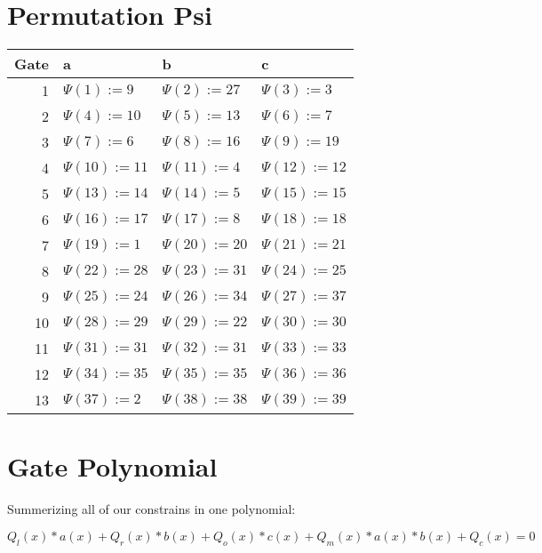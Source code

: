 \documentclass[11pt]{article}
\begin{document}
\section{Permutation Psi}
\label{sec:org8d7dfb9}
\begin{center}
\begin{tabular}{rlll}
Gate & a & b & c\\[0pt]
\hline
1 & \(\Psi(1) := 9\) & \(\Psi(2):={27}\) & \(\Psi(3) := 3\)\\[0pt]
2 & \(\Psi(4) := {10}\) & \(\Psi(5):={13}\) & \(\Psi(6) := 7\)\\[0pt]
3 & \(\Psi(7) := 6\) & \(\Psi(8) := {16}\) & \(\Psi(9) := {19}\)\\[0pt]
4 & \(\Psi({10}) := {11}\) & \(\Psi({11}) := 4\) & \(\Psi({12}) := {12}\)\\[0pt]
5 & \(\Psi({13}) := {14}\) & \(\Psi({14}) := {5}\) & \(\Psi({15}) := {15}\)\\[0pt]
6 & \(\Psi({16}) := {17}\) & \(\Psi({17}) := {8}\) & \(\Psi({18}) := {18}\)\\[0pt]
7 & \(\Psi({19}) := {1}\) & \(\Psi({20}) := {20}\) & \(\Psi({21}) := {21}\)\\[0pt]
8 & \(\Psi({22}) := {28}\) & \(\Psi({23}) := {31}\) & \(\Psi({24}) := {25}\)\\[0pt]
9 & \(\Psi({25}) := {24}\) & \(\Psi({26}) := {34}\) & \(\Psi({27}) := {37}\)\\[0pt]
10 & \(\Psi({28}) := {29}\) & \(\Psi({29}) := {22}\) & \(\Psi({30}) := {30}\)\\[0pt]
11 & \(\Psi({31}) := {31}\) & \(\Psi({32}) := {31}\) & \(\Psi({33}) := {33}\)\\[0pt]
12 & \(\Psi({34}) := {35}\) & \(\Psi({35}) := {35}\) & \(\Psi({36}) := {36}\)\\[0pt]
13 & \(\Psi({37}) := {2}\) & \(\Psi({38}) := {38}\) & \(\Psi({39}) := {39}\)\\[0pt]
\hline
\end{tabular}
\end{center}

\section{Gate Polynomial}
\label{sec:org5caea92}
Summerizing all of our constrains in one polynomial:

\(Q_l(x)*a(x) + Q_r(x)*b(x) + Q_o(x)* c(x) + Q_m(x)*a(x)*b(x) + Q_c(x) = 0\)
\end{document}
